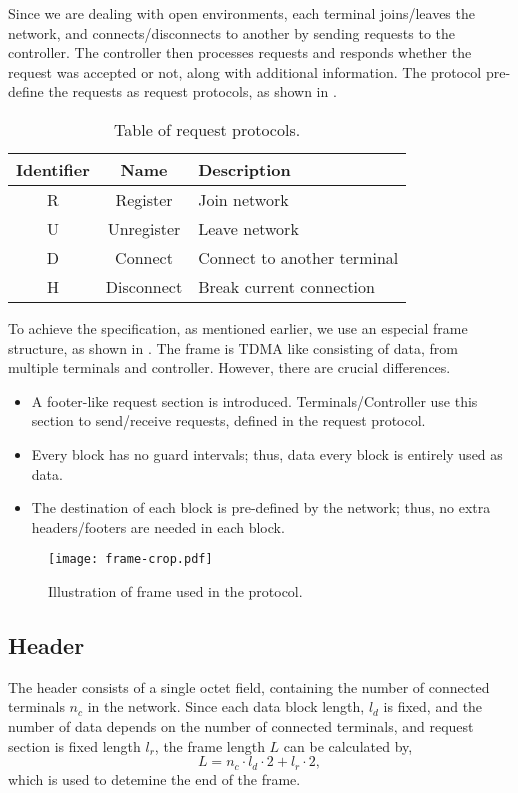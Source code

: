 ﻿\documentclass[twocolumn,9pt]{scrartcl}
\renewcommand{\ref}{\Cref}
\begin{document}
Since we are dealing with open environments, each terminal joins/leaves the network, and connects/disconnects to another by sending requests to the controller.
The controller then processes requests and responds whether the request was accepted or not, along with additional information.
The protocol pre-define the requests as request protocols, as shown in \ref{tab:request}.

\begin{table}[tb]
  \centering
  \caption{\label{tab:request}
    Table of request protocols.
  }
  \begin{tabularx}{\linewidth}{ccl}
    \hline
    Identifier & Name & Description\\
    \hline \hline
    R & Register & Join network\\
    U & Unregister & Leave network\\
    D & Connect & Connect to another terminal\\
    H & Disconnect & Break current connection\\
    \hline
  \end{tabularx}
\end{table}

To achieve the specification, as mentioned earlier, we use an especial frame structure, as shown in \ref{fig:frame}.
The frame is TDMA like consisting of data, from multiple terminals and controller.
However, there are crucial differences.
\begin{itemize}
\item A footer-like request section is introduced.
  Terminals/Controller use this section to send/receive requests, defined in the request protocol.
\item Every block has no guard intervals; thus, data every block is entirely used as data.
\item The destination of each block is pre-defined by the network; thus, no extra headers/footers are needed in each block.
\end{itemize}

\begin{figure}[tb]
  \centering
  \texttt{[image: frame-crop.pdf]}
  \caption{\label{fig:frame}
    Illustration of frame used in the protocol.
  }
\end{figure}

\subsection{Header}
The header consists of a single octet field, containing the number of connected terminals $n_{c}$ in the network.
Since each data block length, $l_d$ is fixed, and the number of data depends on the number of connected terminals, and request section is fixed length $l_r$, the frame length $L$ can be calculated by,
\begin{equation}
  \label{}
  L = n_c \cdot l_d \cdot 2 + l_r \cdot 2,
\end{equation}
which is used to detemine the end of the frame.
\end{document}
